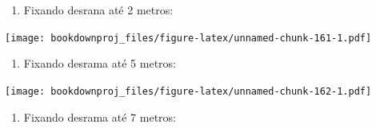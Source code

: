 \documentclass[
]{article}
\newenvironment{Shaded}{\begin{snugshade}}{\end{snugshade}}
\newcommand{\DataTypeTok}[1]{\textcolor[rgb]{0.13,0.29,0.53}{#1}}
\newcommand{\DecValTok}[1]{\textcolor[rgb]{0.00,0.00,0.81}{#1}}
\newcommand{\KeywordTok}[1]{\textcolor[rgb]{0.13,0.29,0.53}{\textbf{#1}}}
\newcommand{\NormalTok}[1]{#1}
\newcommand{\OperatorTok}[1]{\textcolor[rgb]{0.81,0.36,0.00}{\textbf{#1}}}
\newcommand{\StringTok}[1]{\textcolor[rgb]{0.31,0.60,0.02}{#1}}
\providecommand{\tightlist}{%
  \setlength{\itemsep}{0pt}\setlength{\parskip}{0pt}}
\begin{document}
\begin{enumerate}
\def\labelenumi{\arabic{enumi}.}
\setcounter{enumi}{3}
\tightlist
\item
  Fixando desrana até 2 metros:
\end{enumerate}

\begin{Shaded}
\end{Shaded}

\texttt{[image: bookdownproj\_files/figure-latex/unnamed-chunk-161-1.pdf]}

\begin{enumerate}
\def\labelenumi{\arabic{enumi}.}
\setcounter{enumi}{4}
\tightlist
\item
  Fixando desrama até 5 metros:
\end{enumerate}

\begin{Shaded}
\end{Shaded}

\texttt{[image: bookdownproj\_files/figure-latex/unnamed-chunk-162-1.pdf]}

\begin{enumerate}
\def\labelenumi{\arabic{enumi}.}
\setcounter{enumi}{5}
\tightlist
\item
  Fixando desrama até 7 metros:
\end{enumerate}

\begin{Shaded}
\end{Shaded}
\end{document}

